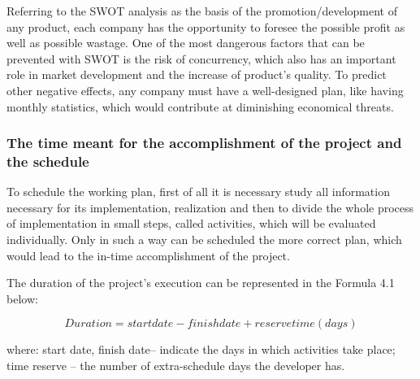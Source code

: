 Referring to the SWOT analysis as the basis of the promotion/development of any product, each company has the opportunity to foresee the possible profit as well as possible wastage. One of the most dangerous factors that can be prevented with SWOT is the risk of concurrency, which also has an important role in market development and the increase of product's quality. To predict other negative effects, any company must have a well-designed plan, like having monthly statistics, which would contribute at diminishing economical threats.

\subsubsection{The time meant for the accomplishment of the project and the schedule}

To schedule the working plan, first of all it is necessary study all information necessary for its implementation, realization and then to divide the whole process of implementation in small steps, called activities, which will be evaluated individually. Only in such a way can be scheduled the more correct plan, which would lead to the in-time accomplishment of the project. 

The duration of the project’s execution can be represented in the Formula 4.1 below:

\begin{equation}
Duration = startdate - finish date + reserve time(days)
\end{equation}

where: start date, finish date– indicate the days in which activities take place;  time reserve – the number of extra-schedule days the developer has.



